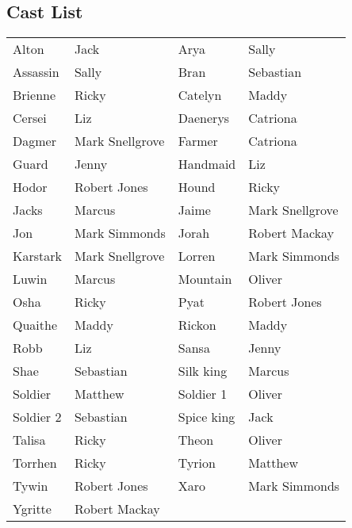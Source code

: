 \subsection*{Cast List}
\begin{tabular}{ll|ll}\\
Alton & Jack &  Arya & Sally\\
Assassin & Sally &  Bran & Sebastian\\
Brienne & Ricky &  Catelyn & Maddy\\
Cersei & Liz &  Daenerys & Catriona\\
Dagmer & Mark Snellgrove &  Farmer & Catriona\\
Guard & Jenny &  Handmaid & Liz\\
Hodor & Robert Jones &  Hound & Ricky\\
Jacks & Marcus &  Jaime & Mark Snellgrove\\
Jon & Mark Simmonds &  Jorah & Robert Mackay\\
Karstark & Mark Snellgrove &  Lorren & Mark Simmonds\\
Luwin & Marcus &  Mountain & Oliver\\
Osha & Ricky &  Pyat & Robert Jones\\
Quaithe & Maddy &  Rickon & Maddy\\
Robb & Liz &  Sansa & Jenny\\
Shae & Sebastian &  Silk king & Marcus\\
Soldier & Matthew &  Soldier 1 & Oliver\\
Soldier 2 & Sebastian &  Spice king & Jack\\
Talisa & Ricky &  Theon & Oliver\\
Torrhen & Ricky &  Tyrion & Matthew\\
Tywin & Robert Jones &  Xaro & Mark Simmonds\\
Ygritte & Robert Mackay &  \end{tabular}
